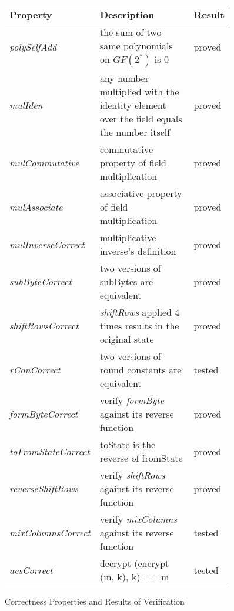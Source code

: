\documentclass[a4paper, notitlepage]{report}
\begin{document}
\begin{figure}
  \begin{center}
    \begin{tabular}{|p{0.25\linewidth} | p{0.5\linewidth} | p{0.15\linewidth} |}
      \hline
      Property & Description & Result \\
      \hline
      \emph{polySelfAdd} & the sum of two same polynomials on $GF(2^*)$ is 0
      & proved \\
      \hline
      \emph{mulIden} & any number multiplied with the identity element over
      the field equals the number itself & proved \\
      \hline
      \emph{mulCommutative} & commutative property of field multiplication
      & proved \\
      \hline
      \emph{mulAssociate} & associative property of field multiplication
      & proved \\
      \hline
      \emph{mulInverseCorrect} & multiplicative inverse's definition
      & proved \\
      \hline
      \emph{subByteCorrect} & two versions of subBytes are equivalent
      & proved \\
      \hline
      \emph{shiftRowsCorrect} & \emph{shiftRows} applied 4 times results in the original state
      & proved \\
      \hline
      \emph{rConCorrect} & two versions of round constants are equivalent
      & tested \\
      \hline
      \emph{formByteCorrect} & verify \emph{formByte} against its reverse function
      & proved \\
      \hline
      \emph{toFromStateCorrect} &  toState is the reverse of fromState
      & proved \\
      \hline
      \emph{reverseShiftRows} & verify \emph{shiftRows} against its reverse function
      & proved \\
      \hline
      \emph{mixColumnsCorrect} & verify \emph{mixColumns} against its reverse function
      & tested \\
      \hline
      \emph{aesCorrect} & decrypt (encrypt (m, k), k) == m
      & tested \\
      \hline
    \end{tabular}
  \end{center}
  \caption{Correctness Properties and Results of Verification}
  \label{fig:properties}
\end{figure}
\end{document}
